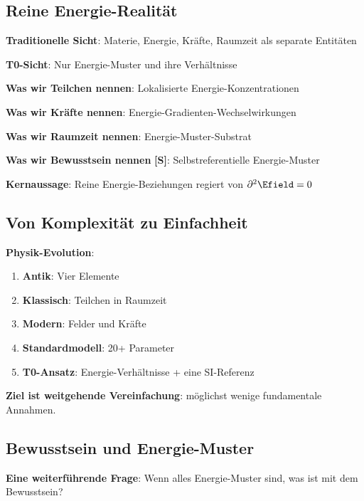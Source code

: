 	\subsection{Reine Energie-Realität}
	
	\begin{tcolorbox}[colback=purple!5!white,colframe=purple!75!black,title=Entmaterialisierte Beschreibung]
		\textbf{Traditionelle Sicht}: Materie, Energie, Kräfte, Raumzeit als separate Entitäten
		
		\textbf{T0-Sicht}: Nur Energie-Muster und ihre Verhältnisse
		
		\textbf{Was wir Teilchen nennen}: Lokalisierte Energie-Konzentrationen
		
		\textbf{Was wir Kräfte nennen}: Energie-Gradienten-Wechselwirkungen
		
		\textbf{Was wir Raumzeit nennen}: Energie-Muster-Substrat
		
		\textbf{Was wir Bewusstsein nennen} \textbf{[S]}: Selbstreferentielle Energie-Muster
		
		\textbf{Kernaussage}: Reine Energie-Beziehungen regiert von $\partial^2 \Efield = 0$
	\end{tcolorbox}
	
	\subsection{Von Komplexität zu Einfachheit}
	
	\textbf{Physik-Evolution}:
	\begin{enumerate}
		\item \textbf{Antik}: Vier Elemente
		\item \textbf{Klassisch}: Teilchen in Raumzeit
		\item \textbf{Modern}: Felder und Kräfte
		\item \textbf{Standardmodell}: 20+ Parameter
		\item \textbf{T0-Ansatz}: Energie-Verhältnisse + eine SI-Referenz
	\end{enumerate}
	
	\textbf{Ziel ist weitgehende Vereinfachung}: möglichst wenige fundamentale Annahmen.
	
	\subsection{Bewusstsein und Energie-Muster}
	
	\textbf{Eine weiterführende Frage}: Wenn alles Energie-Muster sind, was ist mit dem Bewusstsein?
	
